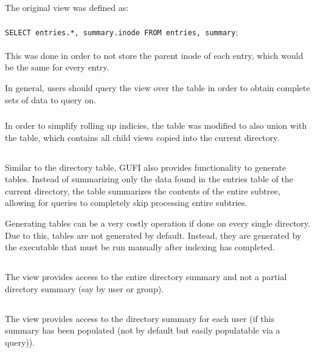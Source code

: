 \subsection{\pentries}
The original \pentries view was defined as:
\\\\
\texttt{SELECT entries.*, summary.inode FROM entries, summary};
\\\\
This was done in order to not store the parent inode of each entry,
which would be the same for every entry.

In general, users should query the \pentries view over the \entries
table in order to obtain complete sets of data to query on.

\subsubsection{\pentriesrollup}
In order to simplify rolling up indicies, the \pentries table was
modified to also union with the \pentriesrollup table, which contains
all child \pentries views copied into the current directory.

\subsection{\treesummary}
Similar to the directory \summary table, GUFI also provides
functionality to generate \treesummary tables. Instead of summarizing
only the data found in the entries table of the current directory, the
\treesummary table summarizes the contents of the entire subtree,
allowing for queries to completely skip processing entire subtries.

Generating \treesummary tables can be a very costly operation if done
on every single directory. Due to this, \treesummary tables are not
generated by default. Instead, they are generated by the \bfti
executable that must be run manually after indexing has completed.

\subsection{\vsummarydir}
The \vsummarydir view provides access to the entire directory summary
and not a partial directory summary (say by user or group).

\subsection{\vsummaryuser}
The \vsummaryuser view provides access to the directory summary for
each user (if this summary has been populated (not by default but
easily populatable via a query)).

